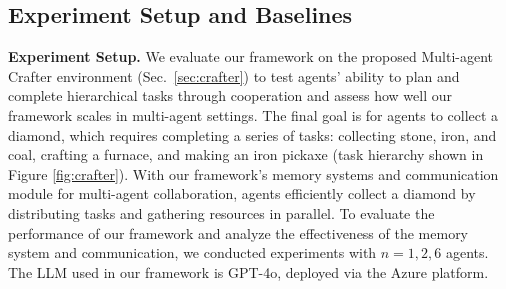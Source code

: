\subsection{Experiment Setup and Baselines}

\textbf{Experiment Setup.} We evaluate our framework on the proposed Multi-agent Crafter environment (Sec.~\ref{sec:crafter}) to test agents' ability to plan and complete hierarchical tasks through cooperation and assess how well our framework scales in multi-agent settings. The final goal is for agents to collect a diamond, which requires completing a series of tasks: collecting stone, iron, and coal, crafting a furnace, and making an iron pickaxe (task hierarchy shown in Figure \ref{fig:crafter}). With our framework's memory systems and communication module for multi-agent collaboration, agents efficiently collect a diamond by distributing tasks and gathering resources in parallel. To evaluate the performance of our framework and analyze the effectiveness of the memory system and communication, we conducted experiments with $n=1,2,6$ agents. The LLM used in our framework is GPT-4o, deployed via the Azure platform.




